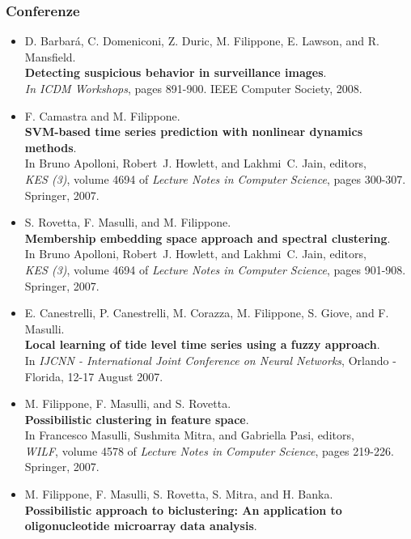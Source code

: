 \documentclass[a4paper,10pt]{article}
\begin{document}
\subsubsection*{Conferenze}
\begin{itemize}
     \item  D. Barbar\'{a}, C. Domeniconi, Z. Duric, M. Filippone, E. Lawson, and R. Mansfield.
       \\\textbf{Detecting suspicious behavior in surveillance images}.
       \\\emph{In ICDM Workshops}, pages 891-900. IEEE Computer Society, 2008. 
     \item  F. Camastra and M. Filippone.
       \\\textbf{SVM-based time series prediction with nonlinear dynamics methods}.
       \\In Bruno Apolloni, Robert~J. Howlett, and Lakhmi~C. Jain, editors,
       \\\emph{KES (3)}, volume 4694 of \emph{Lecture Notes in Computer Science}, pages 300-307. Springer, 2007.
     \item  S. Rovetta, F. Masulli, and M. Filippone.
       \\\textbf{Membership embedding space approach and spectral clustering}.
       \\In Bruno Apolloni, Robert~J. Howlett, and Lakhmi~C. Jain, editors,
       \\\emph{KES (3)}, volume 4694 of \emph{Lecture Notes in Computer Science}, pages 901-908. Springer, 2007.
     \item  E. Canestrelli, P. Canestrelli, M. Corazza, M. Filippone, S. Giove, and F. Masulli.
       \\\textbf{Local learning of tide level time series using a fuzzy approach}.
       \\In \emph{IJCNN - International Joint Conference on Neural Networks}, Orlando - Florida, 12-17 August 2007.
     \item  M. Filippone, F. Masulli, and S. Rovetta.
       \\\textbf{Possibilistic clustering in feature space}.
       \\In Francesco Masulli, Sushmita Mitra, and Gabriella Pasi, editors,
       \\\emph{WILF}, volume 4578 of \emph{Lecture Notes in Computer Science}, pages 219-226. Springer, 2007.
     \item  M. Filippone, F. Masulli, S. Rovetta, S. Mitra, and H. Banka.
       \\\textbf{Possibilistic approach to biclustering: An application to oligonucleotide microarray data analysis}.

\end{itemize}
\end{document}
